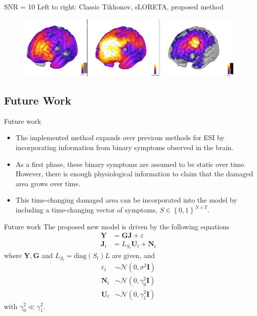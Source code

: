 \documentclass[progressbar=head]{beamer}
\newcommand{\set}[1]{ \left\{ #1 \right\} }
\newcommand{\ppar}[1]{ \left( #1 \right) }
\newcommand{\J}{\mathbf{J}}
\newcommand{\Y}{\mathbf{Y}}
\newcommand{\G}{\mathbf{G}}
\newcommand{\U}{\mathbf{U}}
\newcommand{\N}{\mathbf{N}}
\newcommand{\id}{\mathbf{I}}
\newcommand{\norm}{\mathcal{N}}
\begin{document}
\begin{frame}{SNR = 10}
Left to right: Classic Tikhonov, sLORETA, proposed method
\begin{figure}
\centering
\includegraphics[width=1\linewidth]{./img_oldbeamer/comparison1}
\end{figure}
\end{frame}


{
\subsection{Future Work}
}

\begin{frame}{Future work}
\begin{itemize}
    \item The implemented method expands over previous methods for ESI by incorporating information from binary symptoms observed in the brain.
    \item As a first phase, these binary symptoms are assumed to be static over time. However, there is enough physiological information to claim that the damaged area grows over time.
    \item This time-changing damaged area can be incorporated into the model by including a time-changing vector of symptoms, ${S\in \set{0,1}^{N\times T}}$.
\end{itemize}
\end{frame}

\begin{frame}{Future work}
The proposed new model is driven by the following equations
\begin{align}
    \Y &= \G \J + \varepsilon \\
    \J_t &=  L_{S_t} \U_t + \N_t
\end{align}
where $\Y, \G$ and $L_{S_t} = \text{diag}\ppar{S_t} L$ are given, and
\begin{align}
    \varepsilon_t &\sim  \norm\ppar{0, \sigma^2 \id } \\
    \N_t &\sim  
    \norm\ppar{0, \gamma_0^2 \id } \\
    \U_t &\sim  
    \norm\ppar{0, \gamma_1^2 \id } 
\end{align}
with $\gamma_0^2 \ll \gamma_1^2$.
\end{frame}
\end{document}
